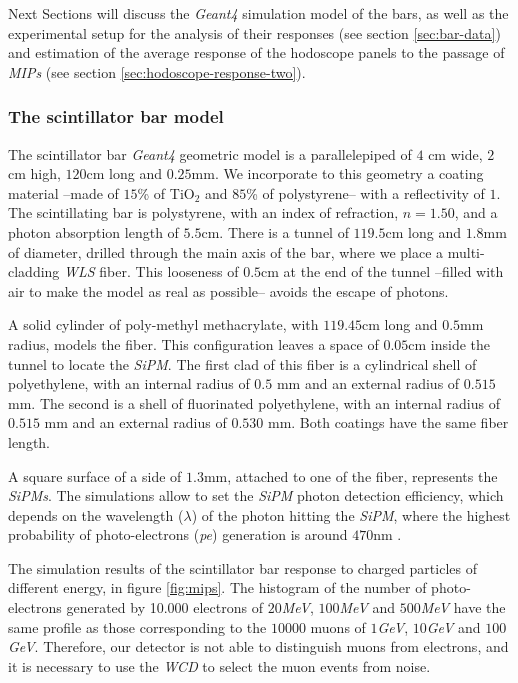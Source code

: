 \documentclass[submitting]{nst}
\begin{document}
Next Sections will discuss the \textsl{Geant4} simulation model of the bars, as well as the experimental setup for the analysis of their responses (see section \ref{sec:bar-data}) and estimation of the average response of the hodoscope panels to the passage of \textsl{MIPs} (see section \ref{sec:hodoscope-response-two}). %


\subsubsection{The scintillator bar model} \label{sec:bar-simulation}%
The scintillator bar \textsl{Geant4} geometric model is a parallelepiped of $4$ cm wide, $2$cm high, $120$cm long and $0.25$mm. We incorporate to this geometry a coating material --made of $15$\% of TiO$_2$ and $85$\% of polystyrene-- with a reflectivity of $1$. The scintillating bar is polystyrene, with an index of refraction, $n =1.50$, and a photon absorption length of $5.5$cm. There is a tunnel of $119.5$cm long and $1.8$mm of diameter, drilled through the main axis of the bar, where we place a multi-cladding \textsl{WLS} fiber. This looseness of $0.5$cm at the end of the tunnel --filled with air to make the model as real as possible-- avoids the escape of photons.

A solid cylinder of poly-methyl methacrylate, with $119.45$cm long and $0.5$mm radius, models the fiber. This configuration leaves a space of $0.05$cm inside the tunnel to locate the \textsl{SiPM}. The first clad of this fiber is a cylindrical shell of polyethylene, with an internal radius of $0.5$ mm and an external radius of $0.515$ mm. The second is a shell of fluorinated polyethylene, with an internal radius of $0.515$ mm and an external radius of $0.530$ mm. Both coatings have the same fiber length.

A square surface of a side of $1.3$mm, attached to one of the fiber, represents the \textsl{SiPMs}. The simulations allow to set the \textsl{SiPM} photon detection efficiency, which depends on the wavelength ($\lambda$) of the photon hitting the \textsl{SiPM}, where the highest probability of photo-electrons (\textsl{pe}) generation is around $470$nm \cite{Hamamatsu2018}. 

The simulation results of the scintillator bar response to charged particles of different energy, in figure \ref{fig:mips}. The histogram of the number of photo-electrons generated by 10.000 electrons of $20$\textsl{MeV}, $100$\textsl{MeV}   and $500$\textsl{MeV} have the same profile as those corresponding to the $10000$ muons of $1$\textsl{GeV}, $10$\textsl{GeV}   and $100$\textsl{GeV}. Therefore, our detector is not able to distinguish muons from electrons, and it is necessary to use the \textsl{WCD} to select the muon events from noise. 
\end{document}
